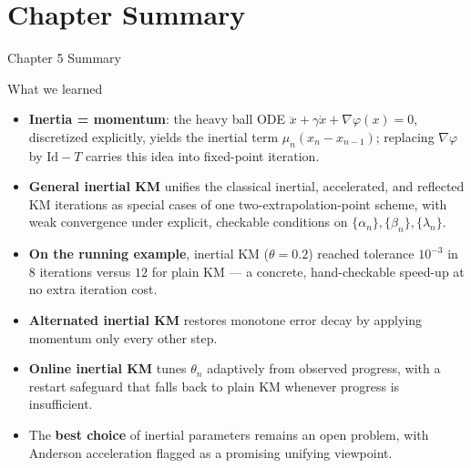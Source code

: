 \documentclass[aspectratio=169,10pt]{beamer}
\newcommand{\Id}{\mathrm{Id}}
\begin{document}
\section{Chapter Summary}

\begin{frame}{Chapter 5 Summary}

  \begin{block}{What we learned}
    \begin{itemize}
      \item \textbf{Inertia = momentum}: the heavy ball ODE
            $\ddot x+\gamma\dot x+\nabla\varphi(x)=0$, discretized
            explicitly, yields the inertial term
            $\mu_n(x_n-x_{n-1})$; replacing $\nabla\varphi$ by
            $\Id-T$ carries this idea into fixed-point iteration.
      \item \textbf{General inertial KM} unifies the classical
            inertial, accelerated, and reflected KM iterations as
            special cases of one two-extrapolation-point scheme,
            with weak convergence under explicit, checkable
            conditions on $\{\alpha_n\},\{\beta_n\},\{\lambda_n\}$.
      \item \textbf{On the running example}, inertial KM
            ($\theta=0.2$) reached tolerance $10^{-3}$ in
            $8$ iterations versus $12$ for plain KM --- a concrete,
            hand-checkable speed-up at no extra iteration cost.
      \item \textbf{Alternated inertial KM} restores monotone error
            decay by applying momentum only every other step.
      \item \textbf{Online inertial KM} tunes $\theta_n$
            adaptively from observed progress, with a restart
            safeguard that falls back to plain KM whenever
            progress is insufficient.
      \item The \textbf{best choice} of inertial parameters remains
            an open problem, with Anderson acceleration flagged as
            a promising unifying viewpoint.
    \end{itemize}
  \end{block}

\end{frame}
\end{document}
